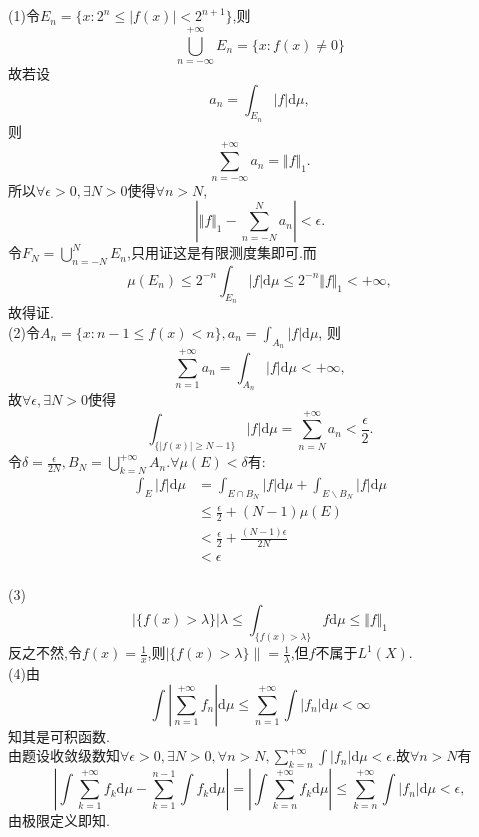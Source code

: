 \documentclass[]{article}
\begin{document}
\section{}
\noindent(1)令$E_n=\{x:2^n\leq |f(x)|<2^{n+1}\}$,则$$\bigcup_{n=-\infty}^{+\infty}E_n=\{x:f(x)\neq0\}$$
故若设$$a_n=\int_{E_n}|f|\mathrm{d}\mu,$$则$$\sum_{n=-\infty}^{+\infty}a_n=\Vert f\Vert_1.$$所以$\forall\epsilon>0,\exists N>0$使得$\forall n>N$,$$|\Vert f\Vert_1-\sum_{n=-N}^{N}a_n|<\epsilon.$$令$F_N=\bigcup_{n=-N}^{N}E_n$,只用证这是有限测度集即可.而$$\mu(E_n)\leq2^{-n}\int_{E_n}|f|\mathrm{d}\mu\leq2^{-n}\Vert f\Vert_1<+\infty,$$故得证.\\
(2)令$A_n=\{x:n-1\leq f(x)<n\},a_n=\int_{A_n}|f|\mathrm{d}\mu$,
则$$\sum_{n=1}^{+\infty}a_n=\int_{A_n}|f|\mathrm{d}\mu<+\infty,$$
故$\forall\epsilon,\exists N>0$使得$$\int_{\{|f(x)|\geq N-1\}}|f|\mathrm{d}\mu=\sum_{n=N}^{+\infty}a_n<\frac{\epsilon}{2}.$$令$\delta=\frac{\epsilon}{2N},B_N=\bigcup_{k=N}^{+\infty}A_n.\forall \mu(E)<\delta$有:
\begin{equation}
	\begin{aligned}	\int_{E}|f|\mathrm{d}\mu&=\int_{E\cap B_N}|f|\mathrm{d}\mu+\int_{E\backslash B_N}|f|\mathrm{d}\mu\\&\leq\frac{\epsilon}{2}+(N-1)\mu(E)\\&<
		\frac{\epsilon}{2}+\frac{(N-1)\epsilon}{2N}\\&<\epsilon
	\end{aligned}
\end{equation}
\\
(3)$$|\{f(x)>\lambda\}|\lambda\leq\int_{\{f(x)>\lambda\}}f\mathrm{d}\mu\leq\Vert f\Vert_1$$反之不然,令$f(x)=\frac{1}{x}$,则$|\{f(x)>\lambda\}\|=\frac{1}{\lambda}$,但$f$不属于$L^1(X)$.\\
(4)由$$\int|\sum_{n=1}^{+\infty}f_n|\mathrm{d}\mu\leq\sum_{n=1}^{+\infty}\int|f_n|\mathrm{d}\mu<\infty$$知其是可积函数.\\
由题设收敛级数知$\forall\epsilon>0,\exists N>0,\forall n>N,\sum_{k=n}^{+\infty}\int|f_n|\mathrm{d}\mu<\epsilon.$故$\forall n>N$有$$|\int\sum_{k=1}^{+\infty}f_k\mathrm{d}\mu-\sum_{k=1}^{n-1}\int f_k\mathrm{d}\mu|=|\int\sum_{k=n}^{+\infty}f_k\mathrm{d}\mu|\leq\sum_{k=n}^{+\infty}\int|f_n|\mathrm{d}\mu<\epsilon,$$由极限定义即知.
\section{}
\end{document}
